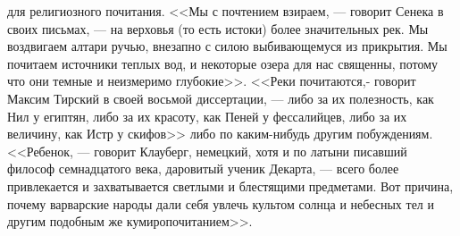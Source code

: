 \documentclass[12pt]{article}
\begin{document}
для религиозного почитания. <<Мы с почтением взираем, --- говорит Сенека в своих письмах, --- на верховья (то есть истоки) более значительных рек. Мы воздвигаем алтари ручью, внезапно с силою выбивающемуся из прикрытия. Мы почитаем источники теплых вод, и некоторые озера для нас священны, потому что они темные и неизмеримо глубокие>>. <<Реки почитаются,- говорит Максим Тирский в своей восьмой диссертации, --- либо за их полезность, как Нил у египтян, либо за их красоту, как Пеней у фессалийцев, либо за их величину, как Истр у скифов>>  либо по каким-нибудь другим побуждениям. <<Ребенок, --- говорит Клауберг, немецкий, хотя и по латыни писавший философ семнадцатого века, даровитый ученик Декарта, --- всего более привлекается и захватывается светлыми и блестящими предметами. Вот причина, почему варварские народы дали себя увлечь культом солнца и небесных тел и другим подобным же кумиропочитанием>>. 
\end{document}

